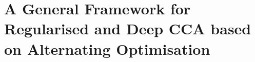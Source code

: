 \chapter{A General Framework for Regularised and Deep CCA based on Alternating Optimisation}\label{chap:framework}

